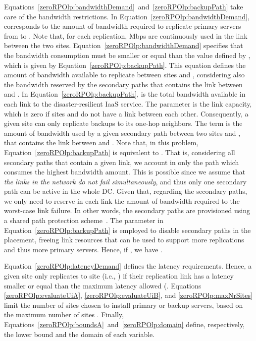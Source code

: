 \documentclass[preprint]{elsarticle}
\begin{document}
Equations~\ref{zeroRPOlp:bandwidthDemand}~and~\ref{zeroRPOlp:backupPath} take care of the bandwidth restrictions. In Equation~\ref{zeroRPOlp:bandwidthDemand},  corresponds to the amount of bandwidth required to replicate  primary servers from  to .
Note that, for each replication,  Mbps are continuously used in the link between the two sites. Equation~\ref{zeroRPOlp:bandwidthDemand} specifies that the bandwidth consumption must be smaller or equal than the value defined by , which is given by Equation~\ref{zeroRPOlp:backupPath}.
This equation defines the amount of bandwidth available  to replicate between sites  and , considering also the bandwidth reserved by the secondary paths that contains the link between  and . In Equation~\ref{zeroRPOlp:backupPath},  is the total bandwidth available in each link to the disaster-resilient IaaS service. The parameter  is the link capacity, which is zero if sites  and  do not have a link between each other. Consequently, a given site can only replicate backups to its one-hop neighbors. The term  is the amount of bandwidth used by a given secondary path between two sites  and , that contains the link between  and . 
Note that, in this problem, Equation~\ref{zeroRPOlp:backupPath} is equivalent to . That is, considering all secondary paths that contain a given link, we account in  only the path which consumes the highest bandwidth amount.
This is possible since we assume that \textit{the links in the network do not fail simultaneously}, and thus only one secondary path can be active in the whole DC. 
Given that, regarding the secondary paths, we only need to reserve in each link the amount of bandwidth required to the worst-case link failure.
In other words, the secondary paths are provisioned using a shared path protection scheme~\cite{ramamurthy2003survivable}.
The  parameter in Equation~\ref{zeroRPOlp:backupPath} is employed to disable secondary paths in the placement, freeing link resources that can be used to support more replications and thus more primary servers. Hence, if , we have .

Equation~\ref{zeroRPOlp:latencyDemand} defines the latency requirements. Hence, a given site  only replicates to site  (i.e., ) if their replication link has a latency  smaller or equal than the maximum latency allowed (. Equations \ref{zeroRPOlp:evaluateUiA}, \ref{zeroRPOlp:evaluateUiB}, and \ref{zeroRPOlp:maxNrSites} limit the number of sites chosen to install primary or backup servers, based on the maximum number of sites . Finally, Equations~\ref{zeroRPOlp:boundsA}~and~\ref{zeroRPOlp:domain} define, respectively, the lower bound and the domain of each variable.  
\end{document}
